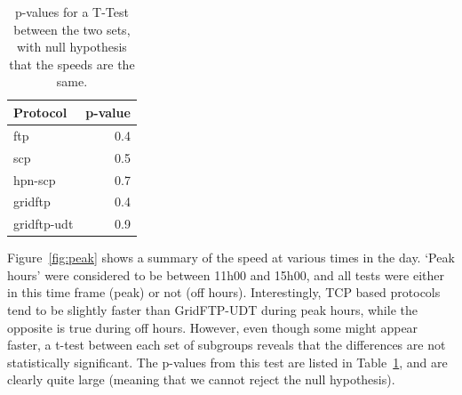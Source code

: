 \documentclass{sig-alternate-05-2015}
\begin{document}
\begin{table}[h]
\centering
	\begin{tabular}{lr}
	\toprule
	Protocol &  p-value \\
	\midrule
	ftp         &      0.4 \\
	scp         &      0.5 \\
	hpn-scp     &      0.7 \\
	gridftp     &      0.4 \\
	gridftp-udt &      0.9 \\
	\bottomrule
	\end{tabular}
\caption{p-values for a T-Test between the two sets, with null hypothesis that the speeds are the same.}
\label{tab:pval}
\end{table}

Figure~\ref{fig:peak} shows a summary of the speed at various times in the day. `Peak hours' were considered to be between 11h00 and 15h00, and all tests were either in this time frame (peak) or not (off hours). Interestingly, TCP based protocols tend to be slightly faster than GridFTP-UDT during peak hours, while the opposite is true during off hours. However, even though some might appear faster, a t-test between each set of subgroups reveals that the differences are not statistically significant. The p-values from this test are listed in Table~\ref{tab:pval}, and are clearly quite large (meaning that we cannot reject the null hypothesis).
\end{document}
